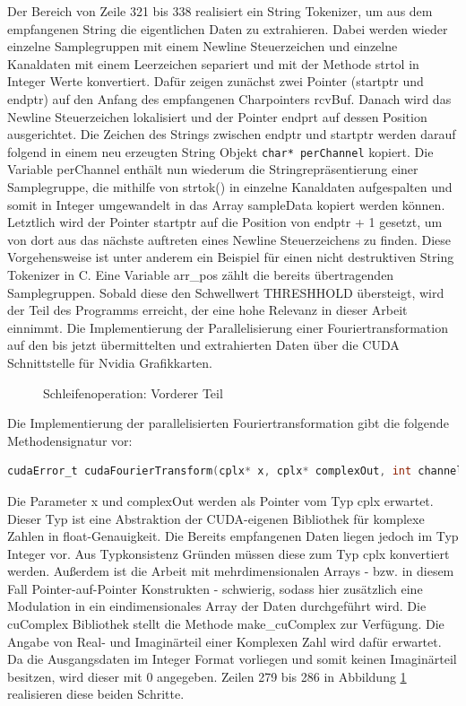 Der Bereich von Zeile 321 bis 338 realisiert ein String Tokenizer, um aus dem empfangenen String die eigentlichen Daten zu extrahieren. Dabei werden wieder einzelne Samplegruppen mit einem Newline Steuerzeichen und einzelne Kanaldaten mit einem Leerzeichen separiert und mit der Methode strtol in Integer Werte konvertiert.
Dafür zeigen zunächst zwei Pointer (startptr und endptr) auf den Anfang des empfangenen Charpointers rcvBuf. Danach wird das Newline Steuerzeichen lokalisiert und der Pointer endprt auf dessen Position ausgerichtet. Die Zeichen des Strings zwischen endptr und startptr werden darauf folgend in einem neu erzeugten String Objekt \texttt{char* perChannel} kopiert. Die Variable perChannel enthält nun wiederum die Stringrepräsentierung einer Samplegruppe, die mithilfe von strtok() in einzelne Kanaldaten aufgespalten und somit in Integer umgewandelt in das Array sampleData kopiert werden können. Letztlich wird der Pointer startptr auf die Position von endptr + 1 gesetzt, um von dort aus das nächste auftreten eines Newline Steuerzeichens zu finden. Diese Vorgehensweise ist unter anderem ein Beispiel für einen nicht destruktiven String Tokenizer in C. Eine Variable arr\_pos zählt die bereits übertragenden Samplegruppen. Sobald diese den Schwellwert THRESHHOLD übersteigt, wird der Teil des Programms erreicht, der eine hohe Relevanz in dieser Arbeit einnimmt. Die Implementierung der Parallelisierung einer Fouriertransformation auf den bis jetzt übermittelten und extrahierten Daten über die CUDA Schnittstelle für Nvidia Grafikkarten.

\begin{figure}[t!]
	
	\caption{Schleifenoperation: Vorderer Teil}
	\label{fig:whileSecond}
\end{figure}

Die Implementierung der parallelisierten Fouriertransformation gibt die folgende Methodensignatur vor:
\begin{lstlisting}[language=C, frame=none]
	cudaError_t cudaFourierTransform(cplx* x, cplx* complexOut, int channelNb, int size)
\end{lstlisting}
Die Parameter x und complexOut werden als Pointer vom Typ cplx erwartet. Dieser Typ ist eine Abstraktion der CUDA-eigenen Bibliothek für komplexe Zahlen in float-Genauigkeit. Die Bereits empfangenen Daten liegen jedoch im Typ Integer vor. Aus Typkonsistenz Gründen müssen diese zum Typ cplx konvertiert werden. Außerdem ist die Arbeit mit mehrdimensionalen Arrays - bzw. in diesem Fall Pointer-auf-Pointer Konstrukten - schwierig, sodass hier zusätzlich eine Modulation in ein eindimensionales Array der Daten durchgeführt wird. Die cuComplex Bibliothek stellt die Methode make\_cuComplex zur Verfügung. Die Angabe von Real- und Imaginärteil einer Komplexen Zahl wird dafür erwartet. Da die Ausgangsdaten im Integer Format vorliegen und somit keinen Imaginärteil besitzen, wird dieser mit 0 angegeben. Zeilen 279 bis 286 in Abbildung \ref{fig:whileSecond} realisieren diese beiden Schritte.

